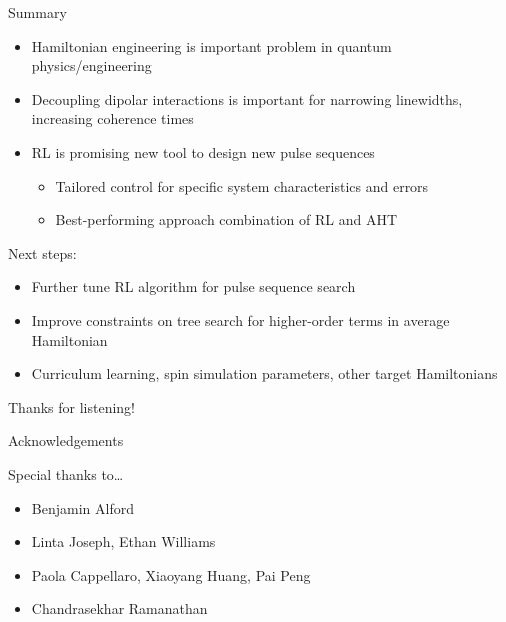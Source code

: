 \documentclass{beamer}
\begin{document}
\begin{frame}{Summary}

\begin{itemize}
    \item Hamiltonian engineering is important problem in quantum physics/engineering
    \item Decoupling dipolar interactions is important for narrowing linewidths, increasing coherence times
    \item RL is promising new tool to design new pulse sequences
    \begin{itemize}
        \item Tailored control for specific system characteristics and errors
        \item Best-performing approach combination of RL and AHT
    \end{itemize}
\end{itemize}

\pause

Next steps:
\begin{itemize}
    \item Further tune RL algorithm for pulse sequence search
    \item Improve constraints on tree search for higher-order terms in average Hamiltonian
    \item Curriculum learning, spin simulation parameters, other target Hamiltonians
\end{itemize}

\pause

\begin{center}
    Thanks for listening!
\end{center}

\end{frame}


\begin{frame}{Acknowledgements}
%

Special thanks to\dots

\begin{itemize}
    \item Benjamin Alford
    \item Linta Joseph, Ethan Williams
    \item Paola Cappellaro, Xiaoyang Huang, Pai Peng
    \item Chandrasekhar Ramanathan
\end{itemize}



\end{frame}
\end{document}

